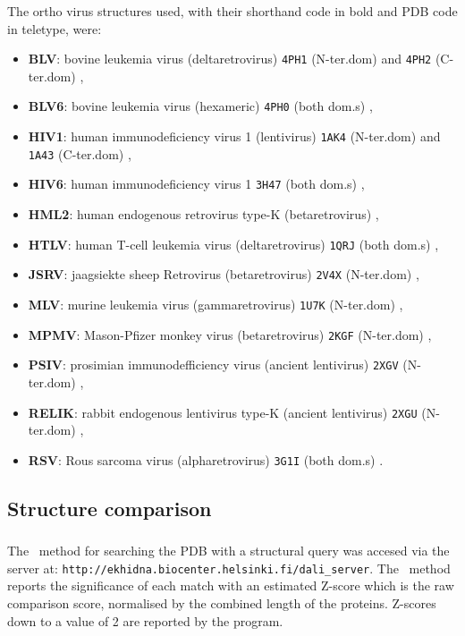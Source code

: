 The ortho virus structures used, with their shorthand code in bold and PDB code in teletype, were:
\begin{itemize}
\item {\bf BLV}:  bovine leukemia virus (deltaretrovirus) {\tt 4PH1} (N-ter.dom) and {\tt 4PH2} (C-ter.dom) \cite{ObalGet15},
\item {\bf BLV6}: bovine leukemia virus (hexameric) {\tt 4PH0} (both dom.s) \cite{ObalGet15},
\item {\bf HIV1}: human immunodeficiency virus 1 (lentivirus) {\tt 1AK4} (N-ter.dom) \cite{GambleTRet96} and {\tt 1A43} (C-ter.dom) \cite{WorthylakeDKet99},
\item {\bf HIV6}: human immunodeficiency virus 1 {\tt 3H47} (both dom.s) \cite{PornillosOet09},
\item {\bf HML2}: human endogenous retrovirus type-K (betaretrovirus) {\tt } \cite{MortuzaGBet08},
\item {\bf HTLV}: human T-cell leukemia virus (deltaretrovirus) {\tt 1QRJ} (both dom.s) \cite{KhorasanizadehSet99},
\item {\bf JSRV}: jaagsiekte sheep Retrovirus (betaretrovirus) {\tt 2V4X} (N-ter.dom) \cite{MortuzaGBet09},
\item {\bf MLV}:  murine leukemia virus (gammaretrovirus) {\tt 1U7K} (N-ter.dom) \cite{MortuzaGBet04},
\item {\bf MPMV}: Mason-Pfizer monkey virus (betaretrovirus) {\tt 2KGF} (N-ter.dom) \cite{MacekPet09},
\item {\bf PSIV}: prosimian immunodefficiency virus (ancient lentivirus) {\tt 2XGV} (N-ter.dom) \cite{GoldstoneDCet10},
\item {\bf RELIK}: rabbit endogenous lentivirus type-K (ancient lentivirus) {\tt 2XGU} (N-ter.dom) \cite{GoldstoneDCet10},
\item {\bf RSV}:  Rous sarcoma virus (alpharetrovirus) {\tt 3G1I} (both dom.s) \cite{BaileyGDet09}.
\end{itemize}

\subsection{Structure comparison}

\subsubsection{\DALI}

The \DALI\ method for searching the PDB with a structural query \cite{HolmLet93a}
was accesed via the server at:
{\tt http://ekhidna.biocenter.helsinki.fi/dali\_server}.
The \DALI\ method reports the significance of each match with an estimated Z-score
which is the raw comparison score, normalised by the combined length of the proteins.
Z-scores down to a value of 2 are reported by the program.

